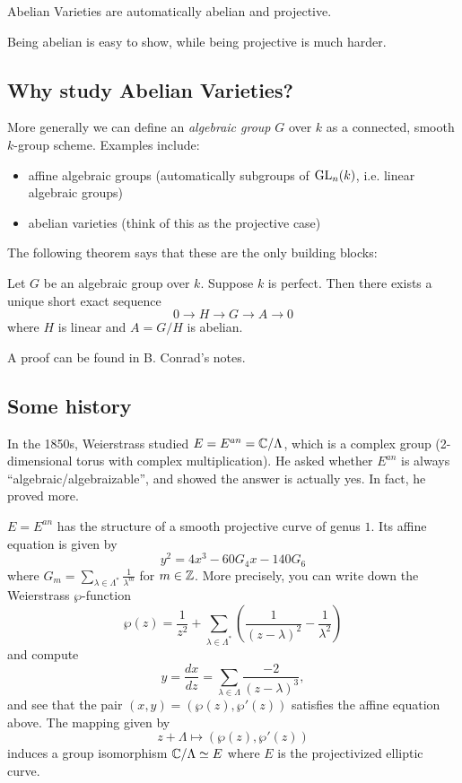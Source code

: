 \begin{theorem}
Abelian Varieties are automatically abelian and projective.
\end{theorem}

Being abelian is easy to show, while being projective is much harder.

\subsection{Why study Abelian Varieties?}

More generally we can define an \emph{algebraic group} $G$ over $k$ as a connected, smooth $k$-group scheme. Examples include:
\begin{itemize}
\item affine algebraic groups (automatically subgroups of $\operatorname{GL}_n(k)$, i.e. linear algebraic groups)
\item abelian varieties (think of this as the projective case)
\end{itemize}

The following theorem says that these are the only building blocks:

\begin{theorem}
Let $G$ be an algebraic group over $k$. Suppose $k$ is perfect. Then there exists a unique short exact sequence 
$$0\to H \to G \to A \to 0$$
where $H$ is linear and $A=G/H$ is abelian. 
\end{theorem}

A proof can be found in B. Conrad's notes. 

\subsection{Some history}
In the 1850s, Weierstrass studied $E=E^{an}={\mathbb C}/\Lambda$, which is a complex group (2-dimensional torus with complex multiplication). He asked whether $E^{an}$ is always ``algebraic/algebraizable'', and showed the answer is actually yes. In fact, he proved more. 

\begin{theorem}
$E=E^{an}$ has the structure of a smooth projective curve of genus $1$. Its affine equation is given by 
$$y^2=4x^3-60G_4x-140G_6$$
where $G_m=\sum_{\lambda\in\Lambda^*} \frac{1}{\lambda^m}$ for $m\in {\mathbb Z}$. More precisely, you can write down the Weierstrass $\wp$-function
$$\wp(z)=\frac{1}{z^2}+\sum_{\lambda\in\Lambda^*}\left(\frac{1}{(z-\lambda)^2}-\frac{1}{\lambda^2}\right)$$
and compute
$$y=\frac{dx}{dz}=\sum_{\lambda\in \Lambda} \frac{-2}{(z-\lambda)^3},$$
and see that the pair $(x,y)=(\wp(z),\wp'(z))$ satisfies the affine equation above. The mapping given by 
$$z+\Lambda\mapsto (\wp(z),\wp'(z))$$ induces a group isomorphism ${\mathbb C}/\Lambda\simeq E$ where $E$ is the projectivized elliptic curve.
\end{theorem}



